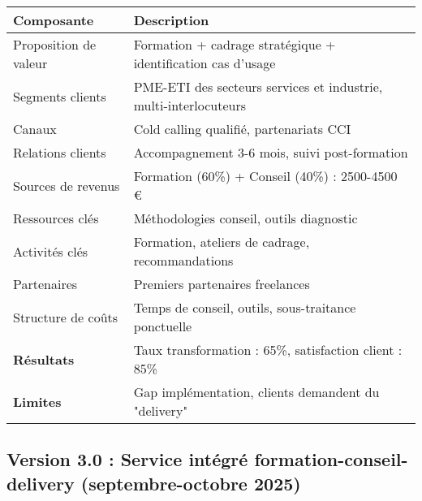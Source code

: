 \begin{longtable}{@{}>{\raggedright\arraybackslash}p{4cm}>{\raggedright\arraybackslash}p{10cm}@{}}
\toprule
\textbf{Composante} & \textbf{Description} \\
\midrule
Proposition de valeur & Formation + cadrage stratégique + identification cas d'usage \\
Segments clients & PME-ETI des secteurs services et industrie, multi-interlocuteurs \\
Canaux & Cold calling qualifié, partenariats CCI \\
Relations clients & Accompagnement 3-6 mois, suivi post-formation \\
Sources de revenus & Formation (60\%) + Conseil (40\%) : 2500-4500 € \\
Ressources clés & Méthodologies conseil, outils diagnostic \\
Activités clés & Formation, ateliers de cadrage, recommandations \\
Partenaires & Premiers partenaires freelances \\
Structure de coûts & Temps de conseil, outils, sous-traitance ponctuelle \\
\midrule
\textbf{Résultats} & Taux transformation : 65\%, satisfaction client : 85\% \\
\textbf{Limites} & Gap implémentation, clients demandent du "delivery" \\
\bottomrule
\end{longtable}

\subsection{Version 3.0 : Service intégré formation-conseil-delivery (septembre-octobre 2025)}

